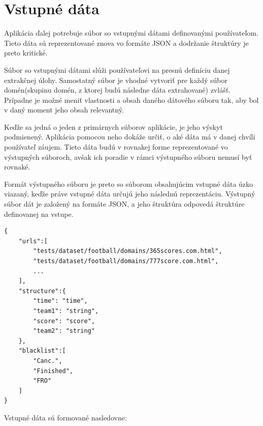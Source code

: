 \section{Vstupné dáta}

Aplikácia ďalej potrebuje súbor so vstupnými dátami definovanými používateľom. Tieto dáta sú reprezentované znova vo formáte JSON a dodržanie štruktúry je preto kritické. 

Súbor so vstupnými dátami slúži používateľovi na presnú definíciu danej extrakčnej úlohy. Samostatný súbor je vhodné vytvoriť pre každý súbor domén(skupinu domén, z ktorej budú následne dáta extrahované) zvlášť. Prípadne je možné meniť vlastnosti a obsah daného dátového súboru tak, aby bol v daný moment jeho obsah relevantný. 

Keďže sa jedná o jeden z primárnych súborov aplikácie, je jeho výskyt podmienený. Aplikácia pomocou neho dokáže určiť, o aké dáta má v danej chvíli používateľ záujem. Tieto dáta budú v rovnakej forme reprezentované vo výstupných súboroch, avšak ich poradie v rámci výstupného súboru nemusí byť rovnaké.

Formát výstupného súboru je preto so súborom obsahujúcim vstupné dáta úzko viazaný, keďže práve vstupné dáta určujú jeho následnú reprezentáciu. Výstupný súbor dát je založený na formáte JSON, a jeho štruktúra odpovedá štruktúre definovanej na vstupe.

\bigskip

\begin{lstlisting}[caption={Príklad súboru so vstupnými dátami},captionpos=b,label={data_ex}]
{
    "urls":[
        "tests/dataset/football/domains/365scores.com.html",
        "tests/dataset/football/domains/777score.com.html",
        ...
    ],
    "structure":{
        "time": "time",
        "team1": "string",
        "score": "score",
        "team2": "string"
    },
    "blacklist":[
        "Canc.",
        "Finished",
        "FRO"
    ]
}
\end{lstlisting}

\bigskip

Vstupné dáta sú formované nasledovne:

